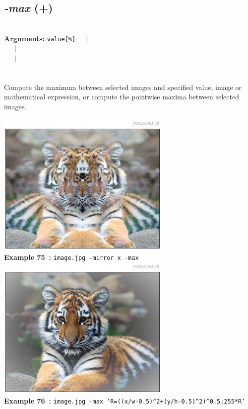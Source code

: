 \documentclass[a4paper,11pt,twoside]{book}
\begin{document}
\subsection{\emph{-max} (+)}\vspace*{-0.5em}
~\\\textbf{Arguments: } 
{\small \texttt{value[\%]}}~~~$|$\\
\hspace*{2.2cm}{\small \texttt{[image]}}~~~$|$\\
~~~$|$\\
\\~\\
Compute the maximum between selected images and specified value, image or
mathematical expression, or compute the pointwise maxima between selected images.
\begin{center}\includegraphics[keepaspectratio=true,height=7cm,width=\textwidth]{img/gmic_def75.jpg}\\
{\footnotesize \textbf{Example 75~:} \texttt{image.jpg --mirror x -max}}
\\\includegraphics[keepaspectratio=true,height=7cm,width=\textwidth]{img/gmic_def76.jpg}\\
{\footnotesize \textbf{Example 76~:} \texttt{image.jpg -max 'R=((x/w-0.5)\textasciicircum 2+(y/h-0.5)\textasciicircum 2)\textasciicircum 0.5;255*R'}}
\end{center}
\end{document}

